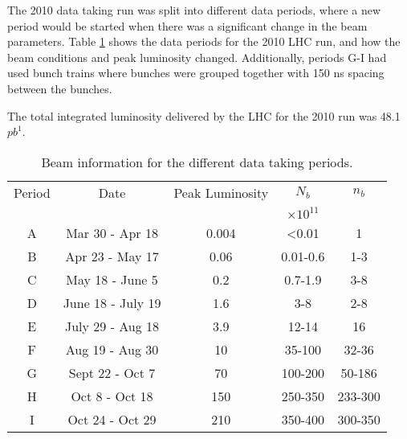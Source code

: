 The 2010 data taking run was split into different data periods, where a new period would be started when there was a significant change in the beam parameters.
Table \ref{Det:Periods} shows the data periods for the 2010 LHC run, and how the beam conditions and peak luminosity changed.  
Additionally, periods G-I had used bunch trains where bunches were grouped together with 150 ns spacing between the bunches.  


The total integrated luminosity delivered by the LHC for the 2010 run was 48.1 $pb^1$.

\begin{table}
\begin{center}
\begin{tabular}{|c|c|c|c|c|}
\hline
Period&Date&Peak Luminosity& $N_b$ & $n_b$ \\
& &\lumi{}& $\times10^{11}$ & \\
\hline
A & Mar 30 - Apr 18 & 0.004 & <0.01 & 1 \\
B & Apr 23 - May 17 & 0.06 & 0.01-0.6 & 1-3 \\
C & May 18 - June 5 & 0.2 & 0.7-1.9 & 3-8 \\
D & June 18 - July 19 & 1.6 & 3-8 & 2-8 \\
E & July 29 - Aug 18 & 3.9 & 12-14 & 16 \\
F & Aug 19 - Aug 30 & 10 & 35-100 & 32-36 \\
G & Sept 22 - Oct 7 & 70 & 100-200 & 50-186 \\
H & Oct 8 - Oct 18 & 150 & 250-350 & 233-300 \\
I & Oct 24 - Oct 29 & 210 & 350-400 & 300-350 \\
\hline
\end{tabular}
\caption{ Beam information for the different data taking periods.}
\label{Det:Periods}
\end{center}
\end{table}

